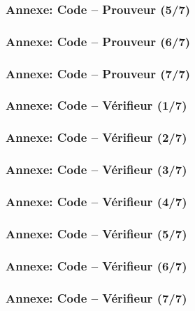 \documentclass{beamer}
\begin{document}
\begin{frame}[fragile]
\frametitle{Annexe: Code -- Prouveur (5/7)}
\vspace{-2mm}

\end{frame}
\begin{frame}[fragile]
\frametitle{Annexe: Code -- Prouveur (6/7)}
\vspace{-2mm}

\end{frame}
\begin{frame}[fragile]
\frametitle{Annexe: Code -- Prouveur (7/7)}
\vspace{-2mm}

\end{frame}
\begin{frame}[fragile]
\frametitle{Annexe: Code -- Vérifieur (1/7)}
\vspace{-2mm}

\end{frame}
\begin{frame}[fragile]
\frametitle{Annexe: Code -- Vérifieur (2/7)}
\vspace{-2mm}

\end{frame}
\begin{frame}[fragile]
\frametitle{Annexe: Code -- Vérifieur (3/7)}
\vspace{-2mm}

\end{frame}
\begin{frame}[fragile]
\frametitle{Annexe: Code -- Vérifieur (4/7)}
\vspace{-2mm}

\end{frame}
\begin{frame}[fragile]
\frametitle{Annexe: Code -- Vérifieur (5/7)}
\vspace{-2mm}

\end{frame}
\begin{frame}[fragile]
\frametitle{Annexe: Code -- Vérifieur (6/7)}
\vspace{-2mm}

\end{frame}
\begin{frame}[fragile]
\frametitle{Annexe: Code -- Vérifieur (7/7)}
\vspace{-2mm}

\end{frame}
\end{document}
